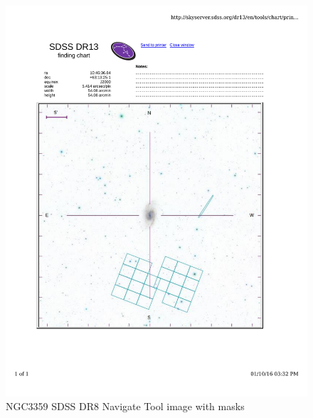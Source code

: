 \documentclass[10pt,letterpaper]{article}
\begin{document}
\begin{figure}[h!]
\centering
\includegraphics[scale=0.7]{figures/NGC3359.pdf}
\caption{NGC3359 SDSS DR8 Navigate Tool image with masks}
\end{figure}
\end{document}
